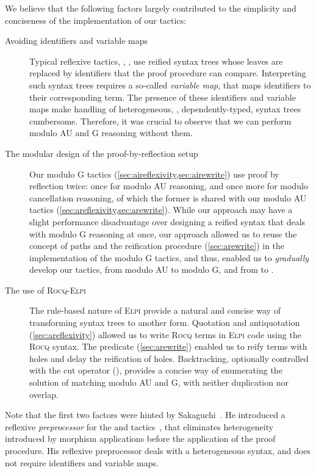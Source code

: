 \documentclass[a4paper,UKenglish,cleveref,autoref]{lipics-v2021}
\newcommand{\Rocq}{{\sffamily\scshape Rocq}\xspace}
\newcommand{\Elpi}{{\sffamily\scshape Elpi}\xspace}
\newcommand{\RocqElpi}{{\sffamily\scshape Rocq-Elpi}\xspace}
\begin{document}
We believe that the following factors largely contributed to the simplicity and conciseness of the
implementation of our tactics:
\begin{description}
\item[Avoiding identifiers and variable maps]
  Typical reflexive tactics, \eg, \cite{DBLP:conf/cpp/BraibantP11,DBLP:conf/tphol/GregoireM05}, use
  reified syntax trees whose leaves are replaced by identifiers that the proof procedure can
  compare. Interpreting such syntax trees requires a so-called \emph{variable map}, that maps
  identifiers to their corresponding term. The presence of these identifiers and variable maps make
  handling of heterogeneous, \eg, dependently-typed, syntax trees cumbersome. Therefore,
  it was crucial to observe that we can perform modulo AU and G reasoning without them.
\item[The modular design of the proof-by-reflection setup]
  Our modulo G tactics (\cref{sec:aireflexivity,sec:airewrite}) use proof by reflection twice: once
  for modulo AU reasoning, and once more for modulo cancellation reasoning, of which the former is
  shared with our modulo AU tactics (\cref{sec:areflexivity,sec:arewrite}).
  While our approach may have a slight performance disadvantage over designing a reified syntax that
  deals with modulo G reasoning at once, our approach allowed us to reuse the concept of paths and
  the reification procedure (\cref{sec:arewrite}) in the implementation of the modulo G tactics, and
  thus, enabled us to \emph{gradually} develop our tactics, from modulo AU to modulo G, and from
   to .
\item[The use of \RocqElpi]
  The rule-based nature of \Elpi provide a natural and concise way of transforming syntax trees to
  another form.
  Quotation and antiquotation (\cref{sec:areflexivity}) allowed us to write \Rocq terms in \Elpi
  code using the \Rocq syntax.
  The  predicate (\cref{sec:arewrite}) enabled us to reify terms with holes
  and delay the reification of holes.
  Backtracking, optionally controlled with the cut operator (\elpi{!}), provides a concise way of
  enumerating the solution of matching modulo AU and G, with neither duplication nor overlap.
\end{description}
Note that the first two factors were hinted by Sakaguchi~\cite{DBLP:conf/itp/Sakaguchi22}.
He introduced a reflexive \emph{preprocessor} for the  and 
tactics~\cite{DBLP:conf/tphol/GregoireM05}, that eliminates heterogeneity introduced by morphism
applications before the application of the proof procedure.
His reflexive preprocessor deals with a heterogeneous syntax, and does not require identifiers and
variable maps.
\end{document}
